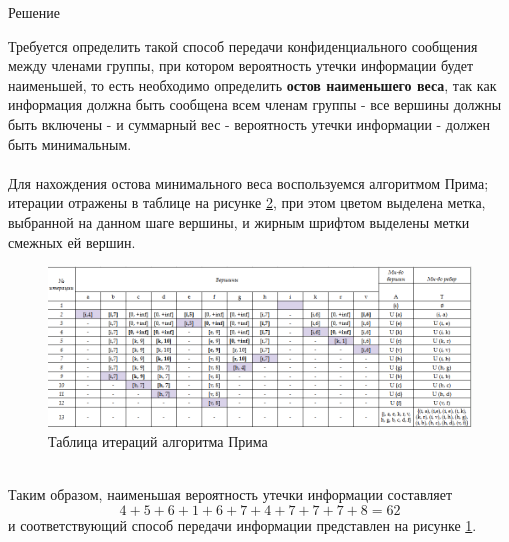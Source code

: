 \documentclass{article}
\begin{document}
\begin{enumerate}
\begin{figure}[ht]
\begin{minipage}[b]{.5\textwidth}
    \label{fig:8_ostov}
  \end{minipage}
\end{figure}
\begin{center}
Решение 
\end{center}
Требуется определить такой способ передачи конфиденциального сообщения между членами группы, при котором вероятность утечки информации будет наименьшей, то есть необходимо определить \textbf{остов наименьшего веса}, так как информация должна быть сообщена всем членам группы - все вершины должны быть включены - и суммарный вес - вероятность утечки информации - должен быть минимальным.\\
\\
Для нахождения остова минимального веса воспользуемся алгоритмом Прима; итерации отражены в таблице на рисунке \ref{fig:8_matrix}, при этом цветом выделена метка, выбранной на данном шаге вершины, и жирным шрифтом выделены метки смежных ей вершин.
\begin{figure}[h]
    \includegraphics[width=\textwidth, center]{attachments/8/1.png}
    \caption{Таблица итераций алгоритма Прима}
    \label{fig:8_matrix}
\end{figure}
\\
Таким образом, наименьшая вероятность утечки информации составляет
$$4+5+6+1+6+7+4+7+7+7+8 = 62$$
и соответствующий способ передачи информации представлен на рисунке \ref{fig:8_ostov}.
\end{enumerate}
\end{document}
